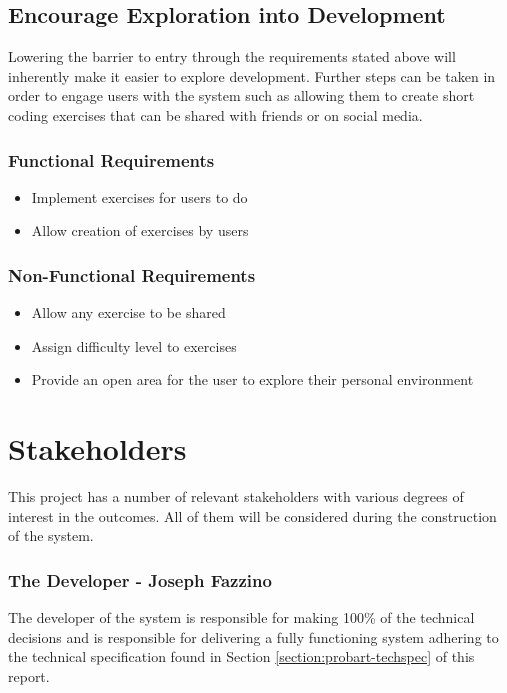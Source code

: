 \subsection{Encourage Exploration into Development}
Lowering the barrier to entry through the requirements stated above will inherently make it easier to explore development. Further steps can be taken in order to engage users with the system such as allowing them to create short coding exercises that can be shared with friends or on social media.

\subsubsection{Functional Requirements}
\begin{itemize}
    \setlength{\itemsep}{0em}
    \item Implement exercises for users to do
    \item Allow creation of exercises by users
\end{itemize}
\subsubsection{Non-Functional Requirements}
\begin{itemize}
    \setlength{\itemsep}{0em}
    \item Allow any exercise to be shared
    \item Assign difficulty level to exercises
    \item Provide an open area for the user to explore their personal environment
\end{itemize}

\section{Stakeholders} \label{section:probart-stake}
This project has a number of relevant stakeholders with various degrees of interest in the outcomes. All of them will be considered during the construction of the system.

\subsubsection{The Developer - Joseph Fazzino}
The developer of the system is responsible for making 100\% of the technical decisions and is responsible for delivering a fully functioning system adhering to the technical specification found in  Section \ref{section:probart-techspec} of this report.

